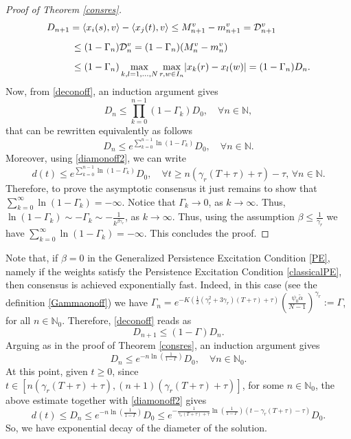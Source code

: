 \documentclass[11pt]{article}
\begin{document}
\begin{proof}[Proof of Theorem \ref{consres}]
		 $$\begin{array}{l}
			\vspace{0.3cm}\displaystyle{D_{n+1}=\langle x_i(s),v\rangle-\langle x_j(t),v\rangle\leq M^v_{n+1}-m^v_{n+1}=\mathcal{D}^v_{n+1}}\\
			\vspace{0.3cm}\displaystyle{\hspace{1cm}\leq (1-\Gamma_n)\mathcal{D}^v_{n}=(1-\Gamma_n)(M^v_{n}-m^v_{n})}\\
			\displaystyle{\hspace{1cm}\leq (1-\Gamma_n)\max_{k,l=1,\dots,N}\max_{r,w\in I_n}\lvert x_{k}(r)-x_{l}(w)\rvert=(1-\Gamma_n)D_{n}.}
		\end{array}$$
		Now, from \eqref{deconoff}, an induction argument gives
		\begin{equation*}
			D_{n}\leq \prod_{k=0}^{n-1}(1-\Gamma_k)D_0,\quad \forall n\in \mathbb{N},
		\end{equation*}
	  that can be rewritten equivalently as follows
		\begin{equation}\label{decayonoffriscritta}
			D_{n}\leq e^{{\sum\limits_{k=0}^{n-1}\ln(1-\Gamma_k)}}D_0,\quad \forall n\in \mathbb{N}.
		\end{equation}
		Moreover, using \eqref{diamonoff2}, we can write $$d(t)\leq e^{\sum\limits_{k=0}^{n-1}\ln(1-\Gamma_k)}D_0,\quad \forall t\geq n(\gamma_r(T+\tau)+\tau)-\tau,\,\forall n\in\mathbb{N}.$$
		Therefore, to prove the asymptotic consensus it just remains to show that 
        $\sum\limits_{k=0}^{\infty}\ln(1-\Gamma_k)=-\infty$. Notice that $\Gamma_k\to 0$, as $k\to \infty$. Thus, $\ln(1-\Gamma_k)\sim-\Gamma_k\sim -\frac{1}{k^{\beta\gamma_r}}$, as $k\to \infty$. Thus, using the assumption $\beta\leq \frac{1}{\gamma_r}$ we have $\sum\limits_{k=0}^{\infty}\ln(1-\Gamma_k)=-\infty$. This concludes the proof.
	\end{proof}
\begin{oss}[Case $\beta=0$]\label{casobeta0}
	Note that, if $\beta=0$ in the Generalized Persistence Excitation Condition \eqref{PE}, namely if the weights satisfy the Persistence Excitation Condition \eqref{classicalPE}, then consensus is achieved exponentially fast. Indeed, in this case (see the definition \eqref{Gammaonoff}) we have $\Gamma_n=e^{-K (\frac{1}{2}(\gamma_{r}^2+3\gamma_r)(T+\tau)+\tau)}\left(\frac{\psi_{0}\tilde{\alpha}}{N-1}\right)^{\gamma_r}:=\Gamma$, for all $n\in\mathbb{N}_0$. Therefore, \eqref{deconoff} reads as 
	$$D_{n+1}\leq (1-\Gamma)D_n.$$
	Arguing as in the proof of Theorem \ref{consres}, an induction argument gives
	$$D_n\leq e^{-n\ln\left(\frac{1}{1-\Gamma}\right)}D_0,\quad \forall n\in \mathbb{N}_0.$$
	At this point, given $t\geq 0$, since $t\in [n(\gamma_r(T+\tau)+\tau),(n+1)(\gamma_r(T+\tau)+\tau)]$, for some $n\in\mathbb{N}_0$, the above estimate together with \eqref{diamonoff2} gives 
	$$d(t)\leq D_n\leq e^{-n\ln\left(\frac{1}{1-\Gamma}\right)}D_0\leq e^{-\frac{1}{\gamma_r(T+\tau)+\tau}\ln\left(\frac{1}{1-\Gamma}\right)(t-\gamma_r(T+\tau)-\tau)}D_0.$$
	So, we have exponential decay of the diameter of the solution.
\end{oss}
\end{document}
